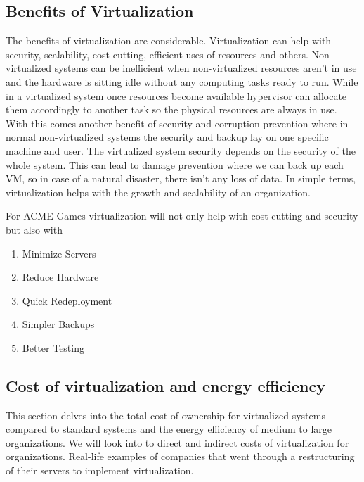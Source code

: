 \documentclass[10pt,oneside,english,a4paper]{article}
\begin{document}
\subsection{Benefits of Virtualization}
The benefits of virtualization are considerable. Virtualization can help with security, scalability, cost-cutting, efficient uses of resources and others. Non-virtualized systems can be inefficient when non-virtualized resources aren’t in use and the hardware is sitting idle without any computing tasks ready to run. While in a virtualized system once resources become available hypervisor can allocate them accordingly to another task so the physical resources are always in use. With this comes another benefit of security and corruption prevention where in normal non-virtualized systems the security and backup lay on one specific machine and user. The virtualized system security depends on the security of the whole system. This can lead to damage prevention where we can back up each VM, so in case of a natural disaster, there isn’t any loss of data. In simple terms, virtualization helps with the growth and scalability of an organization.


For ACME Games virtualization will not only help with cost-cutting and security but also with
\begin{enumerate}
	\item Minimize Servers 
	\item Reduce Hardware
	\item Quick Redeployment
	\item Simpler Backups 
	\item Better Testing
\end{enumerate}

\cite{2.zdroj}\cite{3.zdroj}
\subsection{Cost of virtualization and energy efficiency}
This section delves into the total cost of ownership for virtualized systems compared to standard systems and the energy efficiency of medium to large organizations. We will look into to direct and indirect costs of virtualization for organizations. Real-life examples of companies that went through a restructuring of their servers to implement virtualization.
\end{document}
